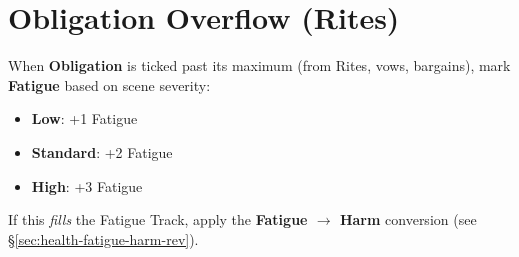 \section{Obligation Overflow (Rites)}
\label{sec:obligation-overflow-rev}

When \textbf{Obligation} is ticked past its maximum (from Rites, vows, bargains), mark \textbf{Fatigue} based on scene severity:
\begin{itemize}
  \item \textbf{Low}: +1 Fatigue
  \item \textbf{Standard}: +2 Fatigue
  \item \textbf{High}: +3 Fatigue
\end{itemize}
If this \emph{fills} the Fatigue Track, apply the \textbf{Fatigue $\rightarrow$ Harm} conversion (see \S\ref{sec:health-fatigue-harm-rev}).
